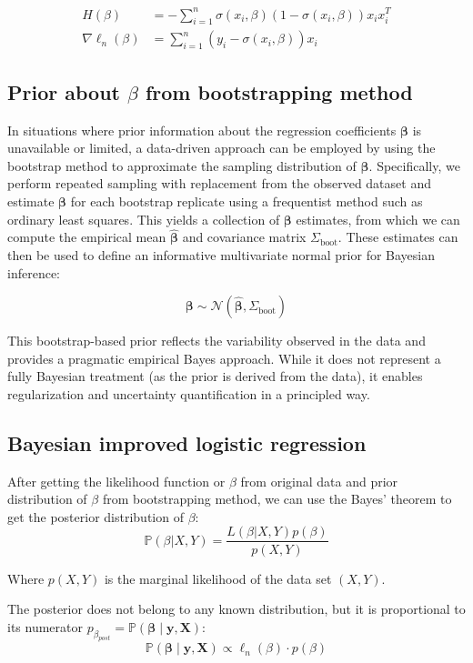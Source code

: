\begin{align*}
    H(\beta) & = -\sum_{i=1}^n \sigma(x_i, \beta)(1-\sigma(x_i, \beta))x_ix_i^T \\
    \nabla \ell_n(\beta) & = \sum_{i=1}^n (y_i - \sigma(x_i, \beta))x_i
\end{align*}

\subsection{Prior about $\beta$ from bootstrapping method}

In situations where prior information about the regression coefficients
 $\boldsymbol{\beta}$ is unavailable or limited, 
a data-driven approach can be employed by using the bootstrap method to approximate
 the sampling distribution of $\boldsymbol{\beta}$. Specifically, we perform repeated 
 sampling with replacement from the observed dataset and estimate $\boldsymbol{\beta}$ 
 for each bootstrap replicate using a frequentist method such as ordinary least squares. 
 This yields a collection of $\boldsymbol{\beta}$ estimates, from which we can compute 
 the empirical mean $\hat{\boldsymbol{\beta}}$ and covariance matrix $\Sigma_{\text{boot}}$. 
 These estimates can then be used to define an informative multivariate normal prior for
  Bayesian inference:

\[
\boldsymbol{\beta} \sim \mathcal{N}(\hat{\boldsymbol{\beta}}, \Sigma_{\text{boot}})
\]

This bootstrap-based prior reflects the variability observed in the data and provides 
a pragmatic empirical Bayes approach. While it does not represent a fully Bayesian treatment 
(as the prior is derived from the data), it enables regularization and uncertainty quantification 
in a principled way.

\subsection{Bayesian improved logistic regression}
After getting the likelihood function or \(\beta\) from original data
 and prior distribution of \(\beta\) from bootstrapping method,
we can use the Bayes' theorem to get the posterior distribution of \(\beta\):
\[
\mathbb P(\beta|X, Y) = \frac{L(\beta|X, Y) p(\beta)}{p(X, Y)} \tag{1-2}
\]

Where \(p(X, Y)\) is the marginal likelihood of the data set \((X, Y)\). 

The posterior does not belong to any known distribution, but it is proportional to its numerator
\(p_{\beta_{post}} =\mathbb P (\boldsymbol{\beta} \mid \mathbf{y}, \mathbf{X}) \):
\[
\mathbb P (\boldsymbol{\beta} \mid \mathbf{y}, \mathbf{X}) \propto \ell_n(\beta) \cdot p(\beta)
\]

